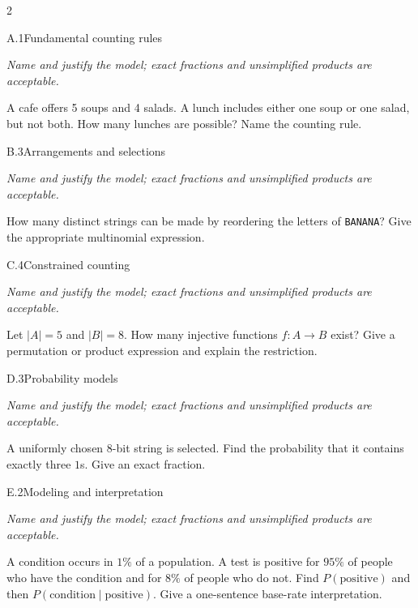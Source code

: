 \documentclass[9pt]{extarticle}
\begin{document}
\CoreWorkArea
\FormBreak
{}
\begin{multicols}{2}
\begin{CoreProblem}{A.1}{Fundamental counting rules}
{\scriptsize\textit{Name and justify the model; exact fractions and unsimplified products are acceptable.}\par}
A cafe offers 5 soups and 4 salads. A lunch includes either one soup
    or one salad, but not both. How many lunches are possible? Name the counting
    rule.
\end{CoreProblem}
\begin{CoreProblem}{B.3}{Arrangements and selections}
{\scriptsize\textit{Name and justify the model; exact fractions and unsimplified products are acceptable.}\par}
How many distinct strings can be made by reordering the letters of
    \texttt{BANANA}? Give the appropriate multinomial expression.
\end{CoreProblem}
\begin{CoreProblem}{C.4}{Constrained counting}
{\scriptsize\textit{Name and justify the model; exact fractions and unsimplified products are acceptable.}\par}
Let $|A|=5$ and $|B|=8$. How many injective functions $f:A\to B$
    exist? Give a permutation or product expression and explain the restriction.
\end{CoreProblem}
\columnbreak
\begin{CoreProblem}{D.3}{Probability models}
{\scriptsize\textit{Name and justify the model; exact fractions and unsimplified products are acceptable.}\par}
A uniformly chosen 8-bit string is selected. Find the probability
    that it contains exactly three $1$s. Give an exact fraction.
\end{CoreProblem}
\begin{CoreProblem}{E.2}{Modeling and interpretation}
{\scriptsize\textit{Name and justify the model; exact fractions and unsimplified products are acceptable.}\par}
A condition occurs in $1\%$ of a population. A test is positive for
    $95\%$ of people who have the condition and for $8\%$ of people who do not.
    Find $P(\text{positive})$ and then
    $P(\text{condition}\mid\text{positive})$. Give a one-sentence base-rate
    interpretation.
\end{CoreProblem}
\end{multicols}
\CoreWorkArea
\FormBreak
{}
\end{document}
